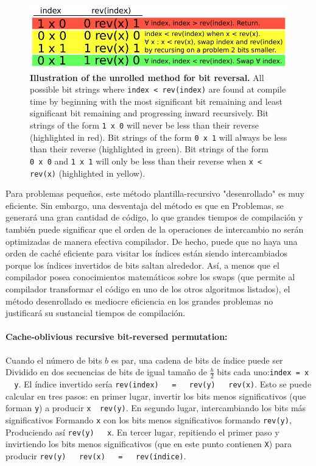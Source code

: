 ﻿\documentclass[10pt]{article}
\begin{document}
{\begin{figure}
\centering
\includegraphics[width=4.5in]{cartoons/unrolled.pdf}
\caption{{\bf Illustration of the unrolled method for bit reversal.}
  All possible bit strings where {\tt index < rev(index)} are found at
  compile time by beginning with the most significant bit remaining
  and least significant bit remaining and progressing inward
  recursively. Bit strings of the form {\tt 1~x~0} will never be less
  than their reverse (highlighted in red). Bit strings of the form
  {\tt 0~x~1} will always be less than their reverse (highlighted in
  green). Bit strings of the form {\tt 0~x~0} and {\tt 1~x~1} will
  only be less than their reverse when {\tt x < rev(x)} (highlighted
  in yellow).
  \label{figure:unrolled}}
\end{figure}

Para problemas pequeños, este método plantilla-recursivo "desenrollado" es
muy eficiente. Sin embargo, una desventaja del método es que en
Problemas, se generará una gran cantidad de código, lo que grandes tiempos de compilación y también puede significar que el orden de la operaciones de intercambio no serán optimizadas de manera efectiva compilador. De hecho, puede que no haya una orden de caché eficiente para visitar los índices están siendo intercambiados porque los índices invertidos de bits saltan alrededor. Así, a menos que el compilador posea conocimientos matemáticos sobre los swaps
(que permite al compilador transformar el código en uno de los otros algoritmos listados), el método desenrollado es mediocre eficiencia en los grandes problemas no justificará su sustancial tiempos de compilación.
\paragraph{Cache-oblivious recursive bit-reversed permutation:}
Cuando el número de bits $ b $ es par, una cadena de bits de índice puede ser
Dividido en dos secuencias de bits de igual tamaño de $\frac{b}{2}$ bits cada uno:{\tt index = x ~ y}. El índice invertido sería {\tt rev(index) ~ = ~ rev(y) ~ rev(x)}. Esto se puede calcular en tres pasos: en primer lugar, invertir los bits menos significativos (que forman {\tt y}) a producir {\tt x ~rev(y)}. En segundo lugar, intercambiando los bits más significativos
Formando {\tt x} con los bits menos significativos formando {\tt rev(y)},
Produciendo así {\tt rev(y) ~ x}. En tercer lugar, repitiendo el primer paso y invirtiendo los bits menos significativos (que en este punto contienen {\tt X}) para producir {\tt rev(y) ~ rev(x) ~ = ~ rev(índice)}.

}
\end{document}
